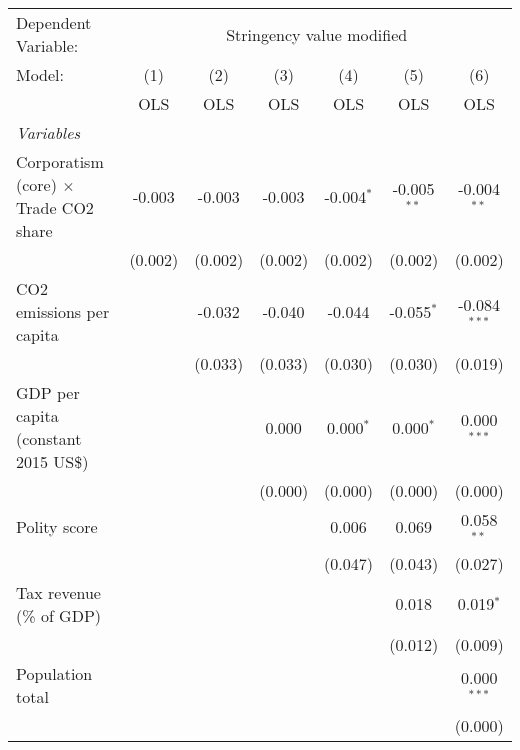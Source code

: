 
\begingroup
\centering
\begin{tabular}{lcccccc}
   \toprule
   Dependent Variable: & \multicolumn{6}{c}{Stringency value modified}\\
   Model:                                       & (1)     & (2)     & (3)     & (4)          & (5)           & (6)\\  
                                                &  OLS    & OLS     & OLS     & OLS          & OLS           & OLS\\  
   \midrule
   \emph{Variables}\\
   Corporatism (core) $\times$ Trade CO2 share  & -0.003  & -0.003  & -0.003  & -0.004$^{*}$ & -0.005$^{**}$ & -0.004$^{**}$\\   
                                                & (0.002) & (0.002) & (0.002) & (0.002)      & (0.002)       & (0.002)\\   
   CO2 emissions per capita                     &         & -0.032  & -0.040  & -0.044       & -0.055$^{*}$  & -0.084$^{***}$\\   
                                                &         & (0.033) & (0.033) & (0.030)      & (0.030)       & (0.019)\\   
   GDP per capita (constant 2015 US\$)          &         &         & 0.000   & 0.000$^{*}$  & 0.000$^{*}$   & 0.000$^{***}$\\   
                                                &         &         & (0.000) & (0.000)      & (0.000)       & (0.000)\\   
   Polity score                                 &         &         &         & 0.006        & 0.069         & 0.058$^{**}$\\   
                                                &         &         &         & (0.047)      & (0.043)       & (0.027)\\   
   Tax revenue (\% of GDP)                      &         &         &         &              & 0.018         & 0.019$^{*}$\\   
                                                &         &         &         &              & (0.012)       & (0.009)\\   
   Population total                             &         &         &         &              &               & 0.000$^{***}$\\   
                                                &         &         &         &              &               & (0.000)\\   

\end{tabular}
